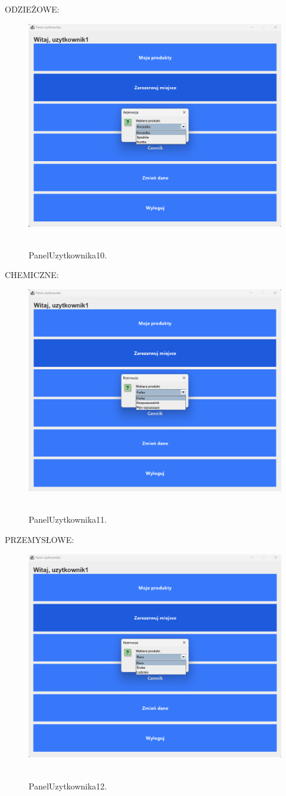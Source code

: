 ODZIEŻOWE:
\begin{figure}[H]
    \centering
    \includegraphics[width=.7\linewidth]{figures/PanelUzytkownika10.png}\
    \caption{PanelUzytkownika10.\label{PanelUzytkownika10}}
\end{figure}
CHEMICZNE:
\begin{figure}[H]
    \centering
    \includegraphics[width=.7\linewidth]{figures/PanelUzytkownika11.png}\
    \caption{PanelUzytkownika11.\label{PanelUzytkownika11}}
\end{figure}
PRZEMYSŁOWE:
\begin{figure}[H]
    \centering
    \includegraphics[width=.7\linewidth]{figures/PanelUzytkownika12.png}\
    \caption{PanelUzytkownika12.\label{PanelUzytkownika12}}
\end{figure}
